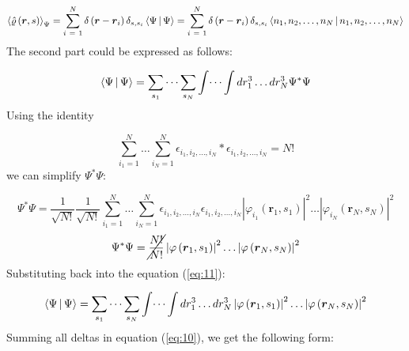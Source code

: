 \begin{equation} \label{eq:10}
\Braket{\hat{\varrho} \left( \boldsymbol{r}, s \right)}_{\Psi}
=
\sum_{i\ =\ 1}^{N} \delta \left( \boldsymbol{r} - \boldsymbol{r}_{i} \right) \delta_{s,s_{i}}
\Braket{\Psi | \Psi}
=
\sum_{i\ =\ 1}^{N} \delta \left( \boldsymbol{r} - \boldsymbol{r}_{i} \right) \delta_{s,s_{i}}
\Braket{n_{1}, n_{2}, \dots, n_{N} | n_{1}, n_{2}, \dots, n_{N}}
\end{equation}
The second part could be expressed as follows:

\begin{equation} \label{eq:11}
\Braket{\Psi | \Psi}
=
\sum_{s_{1}} \dots \sum_{s_{N}} \int \dots \int dr^{3}_{1} \dots dr^{3}_{N} \Psi^{\ast} \Psi
\end{equation}
Using the identity

\begin{equation} \label{eq:12}
\sum_{i_{1} = 1}^{N} \dots \sum_{i_{N} = 1}^{N}
\epsilon_{i_{1}, i_{2}, \dots, i_{N}}
*
\epsilon_{i_{1}, i_{2}, \dots, i_{N}}
=
N!
\end{equation}
we can simplify $\Psi^{\ast} \Psi$:

\begin{equation} \label{eq:13}
\Psi^{\ast} \Psi
=
\frac{1}{\sqrt{N!}} \frac{1}{\sqrt{N!}}
\sum_{i_{1} = 1}^{N} \dots \sum_{i_{N} = 1}^{N}
\epsilon_{i_{1}, i_{2}, \dots, i_{N}} \epsilon_{i_{1}, i_{2}, \dots, i_{N}}
\left| \varphi_{i_{1}} \left( \boldsymbol{r}_{1}, s_{1} \right) \right|^{2}
\dots
\left| \varphi_{i_{N}} \left( \boldsymbol{r}_{N}, s_{N} \right) \right|^{2}
\end{equation}
\begin{equation} \label{eq:14}
\Psi^{\ast} \Psi
=
\cancel{\frac{N!}{N!}}
\left| \varphi \left( \boldsymbol{r}_{1}, s_{1} \right) \right|^{2}
\dots
\left| \varphi \left( \boldsymbol{r}_{N}, s_{N} \right) \right|^{2}
\end{equation}
Substituting back into the equation (\ref{eq:11}):

\begin{equation} \label{eq:15}
\Braket{\Psi | \Psi}
=
\sum_{s_{1}} \dots \sum_{s_{N}} \int \dots \int dr^{3}_{1} \dots dr^{3}_{N}
\left| \varphi \left( \boldsymbol{r}_{1}, s_{1} \right) \right|^{2}
\dots
\left| \varphi \left( \boldsymbol{r}_{N}, s_{N} \right) \right|^{2}
\end{equation}
Summing all deltas in equation (\ref{eq:10}), we get the following form:

